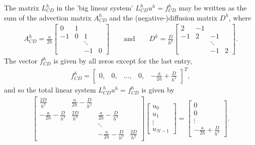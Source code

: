 \begin{problem}{1}
\begin{solution}
The matrix $L^h_{CD}$ in the 'big linear system' $L^h_{CD}u^h=f^h_{CD}$
may be written as the sum of the advection matrix $A^h_{CD}$ and the
(negative-)diffusion matrix $D^h$, where
\begin{align*}
    A^h_{CD} = \frac{a}{2h}
    \begin{bmatrix}
		0  &  1 &         &    \\
	   -1  &  0 &  1      &    \\
		   &    &  \ddots &    \\
		   &    &      -1 &  0
    \end{bmatrix}
    \qquad\text{and}\qquad
    D^h = \frac{D}{h^2}
    \begin{bmatrix}
	    2  & -1  &         &    \\
	   -1  &  2  & -1      &    \\
		   &     &  \ddots &    \\
		   &     &      -1 &  2
	\end{bmatrix}.
\end{align*}
%
The vector $f^h_{CD}$ is given by all zeros except for the last entry,
\begin{align*}
	f^h_{CD} =
    \begin{bmatrix}
	    0, & 0, & \hdots, & 0, & -\frac{a}{2h} + \frac{D}{h^2}
	\end{bmatrix}^T,
\end{align*}
and so the total linear system $L^h_{CD} u^h = f^h_{CD}$ is given by
\begin{align*}
    \begin{bmatrix}
	    \frac{2D}{h^2} & \frac{a}{2h} - \frac{D}{h^2} &  & \\
	   -\frac{a}{2h} - \frac{D}{h^2}  & \frac{2D}{h^2} & \frac{a}{2h} -\frac{D}{h^2} & \\
	   & & \ddots & \\
	   & & -\frac{a}{2h} - \frac{D}{h^2} & \frac{2D}{h^2}
    \end{bmatrix}
    \begin{bmatrix}
        u_0 \\ u_1 \\ \vdots \\ u_{N-1}
    \end{bmatrix}
    =
    \begin{bmatrix}
	    0 \\ 0 \\ \vdots \\ -\frac{a}{2h} + \frac{D}{h^2}
	\end{bmatrix}.
\end{align*}


\end{solution}
\end{problem}
